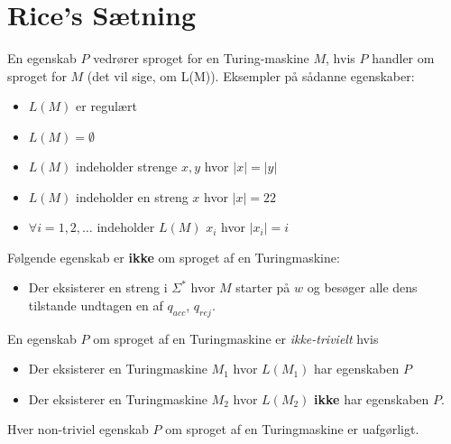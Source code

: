 \section{Rice's Sætning}%
\label{sec:label}

En egenskab $P$ vedrører sproget for en Turing-maskine $M$, hvis $P$ handler om sproget for $M$ (det vil sige, om L(M)). Eksempler på sådanne egenskaber:
\begin{itemize}
	\item $L(M)$ er regulært
	\item $L(M) = \emptyset$
	\item $L(M)$ indeholder strenge $x,y$ hvor $|x| = |y|$
	\item $L(M)$ indeholder en streng $x$ hvor $|x| = 22$
	\item $\forall i = 1, 2, \ldots$ indeholder $L(M)$ $x_{i}$ hvor $|x_{i}| = i$
\end{itemize}

Følgende egenskab er \textbf{ikke}  om sproget af en Turingmaskine:
\begin{itemize}
	\item Der eksisterer en streng i $\Sigma^{*}$ hvor $M$ starter på $w$ og besøger alle dens tilstande undtagen en af $q_{acc}$, $q_{rej}$.
\end{itemize}

\begin{definition}
	En egenskab $P$ om sproget af en Turingmaskine er \textit{ikke-trivielt} hvis
	\begin{itemize}
		\item Der eksisterer en Turingmaskine $M_{1}$ hvor $L(M_{1})$ har egenskaben $P$
		\item Der eksisterer en Turingmaskine $M_{2}$ hvor $L(M_{2})$ \textbf{ikke} har egenskaben $P$.
	\end{itemize}
\end{definition}

\begin{theorem}
	\label{teo:rice}
	Hver non-triviel egenskab $P$ om sproget af en Turingmaskine er uafgørligt.
\end{theorem}

